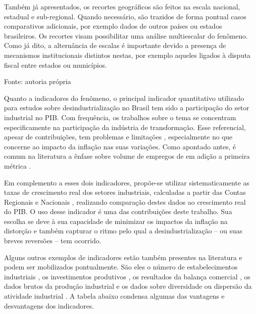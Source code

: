 Também já apresentados, os recortes geográficos são feitos na escala
nacional, estadual e sub-regional. Quando necessário, são trazidos de
forma pontual casos comparativos adicionais, por exemplo dados de
outros países ou estados brasileiros. Os recortes visam possibilitar
uma análise multiescalar do fenômeno. Como já dito, a alternância de
escalas é importante devido a presença de mecanismos institucionais
distintos nestas, por exemplo aqueles ligados à disputa fiscal entre
estados ou municípios.

\begin{table}[htbp]
\centering
\caption{Casos e recortes temporais}
\label{tab:cap03-casos-recortes}
\end{table}

Fonte: autoria própria

Quanto a indicadores do fenômeno, o principal indicador quantitativo
utilizado para estudos sobre desindustrialização no Brasil tem sido a
participação do setor industrial no PIB. Com frequência, os trabalhos
sobre o tema se concentram especificamente na participação da indústria
de transformação. Esse referencial, apesar de contribuições, tem
problemas e limitações ,
especialmente no que concerne ao impacto da inflação nas suas
variações. Como apontado antes, é comum na literatura a ênfase sobre
volume de empregos de em adição a primeira métrica
\citep{tregenna_characterising_2009}.

Em complemento a esses dois indicadores, propõe-se utilizar
sistematicamente as taxas de crescimento real dos setores industriais,
calculadas a partir das Contas Regionais  e
Nacionais , realizando comparação destes dados ao
crescimento real do PIB. O uso desse indicador é uma das contribuições
deste trabalho. Sua escolha se deve à sua capacidade de minimizar os
impactos da inflação na distorção e também capturar o ritmo pelo qual a
desindustrialização -- ou suas breves reversões -- tem ocorrido.

Alguns outros exemplos de indicadores estão também presentes na
literatura e podem ser mobilizados pontualmente. São eles o número de
estabelecimentos industriais , os investimentos
produtivos , os
resultados da balança comercial \citep{marconi_taxa_2012}, os dados
brutos da produção industrial  e os dados sobre
diversidade ou dispersão da atividade industrial . A tabela abaixo condensa algumas das vantagens e
desvantagens dos indicadores.

